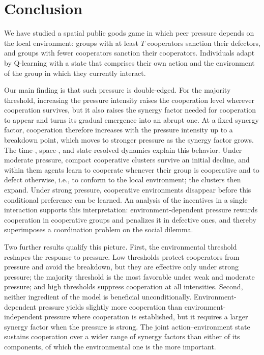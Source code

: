 \documentclass[%
  aip,cha,
  amsmath,amssymb,
  reprint,
  article-title,
]{revtex4-2}
\begin{document}
\section{Conclusion}\label{sec:conclusion}

We have studied a spatial public goods game in which peer pressure depends on the local environment: groups with at least $T$ cooperators sanction their defectors, and groups with fewer cooperators sanction their cooperators. Individuals adapt by Q-learning with a state that comprises their own action and the environment of the group in which they currently interact.

Our main finding is that such pressure is double-edged. For the majority threshold, increasing the pressure intensity raises the cooperation level wherever cooperation survives, but it also raises the synergy factor needed for cooperation to appear and turns its gradual emergence into an abrupt one. At a fixed synergy factor, cooperation therefore increases with the pressure intensity up to a breakdown point, which moves to stronger pressure as the synergy factor grows. The time-, space-, and state-resolved dynamics explain this behavior. Under moderate pressure, compact cooperative clusters survive an initial decline, and within them agents learn to cooperate whenever their group is cooperative and to defect otherwise, i.e., to conform to the local environment; the clusters then expand. Under strong pressure, cooperative environments disappear before this conditional preference can be learned. An analysis of the incentives in a single interaction supports this interpretation: environment-dependent pressure rewards cooperation in cooperative groups and penalizes it in defective ones, and thereby superimposes a coordination problem on the social dilemma.

Two further results qualify this picture. First, the environmental threshold reshapes the response to pressure. Low thresholds protect cooperators from pressure and avoid the breakdown, but they are effective only under strong pressure; the majority threshold is the most favorable under weak and moderate pressure; and high thresholds suppress cooperation at all intensities. Second, neither ingredient of the model is beneficial unconditionally. Environment-dependent pressure yields slightly more cooperation than environment-independent pressure where cooperation is established, but it requires a larger synergy factor when the pressure is strong. The joint action--environment state sustains cooperation over a wider range of synergy factors than either of its components, of which the environmental one is the more important.
\end{document}
